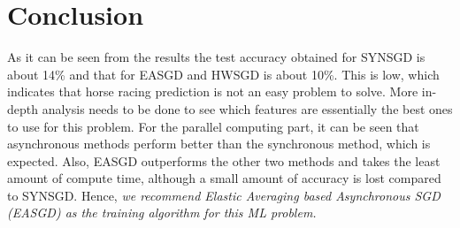 \documentclass[12pt]{article}
\begin{document}
\section{Conclusion}
As it can be seen from the results the test accuracy obtained for SYNSGD is about 14\% and that for EASGD and HWSGD is about 10\%. This is low, which indicates that horse racing prediction is not an easy problem to solve. More in-depth analysis needs to be done to see which features are essentially the best ones to use for this problem. For the parallel computing part, it can be seen that asynchronous methods perform better than the synchronous method, which is expected. Also, EASGD outperforms the other two methods and takes the least amount of compute time, although a small amount of accuracy is lost compared to SYNSGD. Hence, \textit{we recommend Elastic Averaging based Asynchronous SGD (EASGD) as the training algorithm for this ML problem.}




\end{document}
